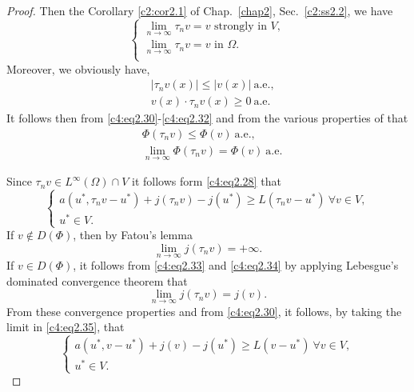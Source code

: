 \begin{proof}
Then the Corollary \ref{c2:cor2.1} of Chap.~\ref{chap2}, 
Sec.~\ref{c2:ss2.2}, we have
 \begin{equation}
\begin{cases}
\lim\limits_{n \to \infty} \tau_n v = v \text{ strongly in } V, \\
\lim\limits_{n \to \infty} \tau_n v = v \text{ in } \Omega. \\
\end{cases}\tag{2.30}\label{c4:eq2.30}
 \end{equation} 
 Moreover, we obviously have,
 \begin{align}
& |\tau_n v (x) | \leq | v (x) | ~\text{a.e.,} \tag{2.31}\label{c4:eq2.31}\\
& v (x) \cdot \tau_n v (x) \geq 0 ~\text{a.e.} \tag{2.32}\label{c4:eq2.32}
 \end{align}\pageoriginale 
It follows then from \eqref{c4:eq2.30}-\eqref{c4:eq2.32} and from the various properties of that
 \begin{align}
& \Phi (\tau_n v) \leq \Phi (v) ~\text{a.e.,} \tag{2.33}\label{c4:eq2.33}\\
& \lim_{n \to \infty} \Phi (\tau_n v) = \Phi (v) ~\text{a.e.} \tag{2.34}\label{c4:eq2.34}
 \end{align} 
 
 Since $\tau_n v \in L^\infty (\Omega) \cap V$ it follows form \eqref{c4:eq2.28} that
 \begin{equation}
\begin{cases}
a (u^*, \tau_n v - u^*) + j (\tau_n v) - j (u^*) \geq L (\tau_n v - u^*) \ \forall v \in V, \\
u^*  \in V. \tag{2.35}\label{c4:eq2.35}
\end{cases}
 \end{equation}
 If $v \notin D (\Phi)$, then by Fatou's lemma 
$$
\lim_{n \to \infty} j (\tau_n v) = + \infty.
$$
If $v \in D (\Phi)$, it follows from \eqref{c4:eq2.33} and
\eqref{c4:eq2.34} by applying Lebesgue's dominated convergence theorem
that 
$$
\lim_{n \to \infty} j (\tau_n v) = j (v).
$$
From these convergence properties and from \eqref{c4:eq2.30}, it follows, by taking the limit in \eqref{c4:eq2.35}, that
 \begin{equation}
\begin{cases}
a (u^*, v - u^*) + j (v) -j (u^*) \geq L (v -u^*) \ \forall v \in V,\\
u^* \in V. \tag{2.36}\label{c4:eq2.36}
\end{cases}
 \end{equation}
 

\end{proof}
